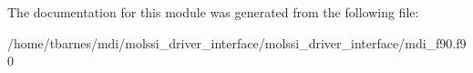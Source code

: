 The documentation for this module was generated from the following file\-:\begin{DoxyCompactItemize}
\item 
/home/tbarnes/mdi/molssi\-\_\-driver\-\_\-interface/molssi\-\_\-driver\-\_\-interface/mdi\-\_\-f90.\-f90\end{DoxyCompactItemize}
